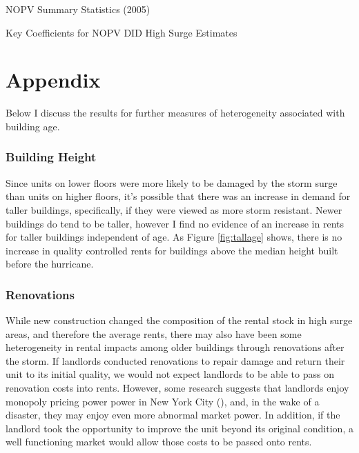\documentclass[12pt]{article}
\begin{document}
{{{{{{\begin{table}[!htbp]
\centering
\caption{\label{tab:NOPV stats}NOPV Summary Statistics (2005)}

\end{table}

\begin{table}[!htbp]
\centering
\caption{\label{tab:NOPV res}Key Coefficients for NOPV DID High Surge Estimates}

\end{table}


% 

\clearpage
\appendix

\section{Appendix}{\label{sec:AppA}
\setcounter{figure}{0}
\setcounter{table}{0}

Below I discuss the results for further measures of heterogeneity associated with building age. 

\subsubsection{Building Height}
Since units on lower floors were more likely to be damaged by the storm surge than units on higher floors, it's possible that there was an increase in demand for taller buildings, specifically, if they were viewed as more storm resistant. Newer buildings do tend to be taller, however I find no evidence of an increase in rents for taller buildings independent of age. As Figure \ref{fig:tallage} shows, there is no increase in quality controlled rents for buildings above the median height built before the hurricane. 

\subsubsection{Renovations} {\label{sec:Renovations}
While new construction changed the composition of the rental stock in high surge areas, and therefore the average rents, there may also have been some heterogeneity in rental impacts among older buildings through renovations after the storm.  If landlords conducted renovations to repair damage and return their unit to its initial quality, we would not expect landlords to be able to pass on renovation costs into rents.  However, some research suggests that landlords enjoy monopoly pricing power power in New York City (\cite{watson_is_2021}), and, in the wake of a disaster, they may enjoy even more abnormal market power. In addition, if the landlord took the opportunity to improve the unit beyond its original condition, a well functioning market would allow those costs to be passed onto rents. 

}}}}}}}}
\end{document}
